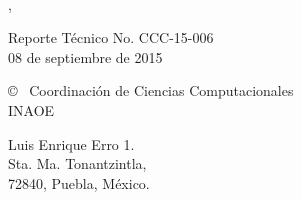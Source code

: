 \begin{titlepage}
    \begin{center}
        \mbox{ }\par
        \vspace{2.5cm}
        {\huge\bfseries\titulo\par}
        {\Large \nombre, \tutorA \par}
        \vspace{3cm}
        {\Large Reporte T\'ecnico No. CCC-15-006\\
		08 de septiembre de 2015 \par}
        \vspace{5cm}
        {\Large \copyright~ Coordinaci\'on de Ciencias Computacionales\\
        INAOE\par}
       \vspace{2cm}
    \end{center}
    \begin{center}
    		{\Large
        Luis Enrique Erro 1. \\ Sta. Ma. Tonantzintla, \\ 72840, Puebla, M\'exico. \par}
    \end{center}
    


\end{titlepage}

\addtolength{\hoffset}{0.5cm}
\addtolength{\voffset}{2.0cm}
\addtolength{\oddsidemargin}{-3.0cm}  